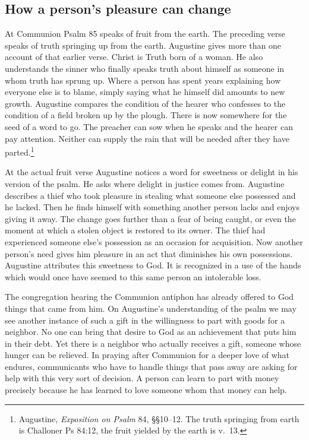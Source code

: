 \subsection{How a person's pleasure can change}

At Communion Psalm 85 speaks of fruit from the earth. The preceding verse speaks of truth springing up from the earth. Augustine gives more than one account of that earlier verse. Christ is Truth born of a woman. He also understands the sinner who finally speaks truth about himself as someone in whom truth has sprung up. Where a person has spent years explaining how everyone else is to blame, simply saying what he himself did amounts to new growth. Augustine compares the condition of the hearer who confesses to the condition of a field broken up by the plough. There is now somewhere for the seed of a word to go. The preacher can sow when he speaks and the hearer can pay attention. Neither can supply the rain that will be needed after they have parted.\footnote{Augustine, \textit{Exposition on Psalm} 84, §§10--12. The truth springing from earth is Challoner Ps 84:12, the fruit yielded by the earth is v.~13.}

At the actual fruit verse Augustine notices a word for sweetness or delight in his version of the psalm. He asks where delight in justice comes from. Augustine describes a thief who took pleasure in stealing what someone else possessed and he lacked. Then he finds himself with something another person lacks and enjoys giving it away. The change goes further than a fear of being caught, or even the moment at which a stolen object is restored to its owner. The thief had experienced someone else's possession as an occasion for acquisition. Now another person's need gives him pleasure in an act that diminishes his own possessions. Augustine attributes this sweetness to God. It is recognized in a use of the hands which would once have seemed to this same person an intolerable loss.

The congregation hearing the Communion antiphon has already offered to God things that came from him. On Augustine's understanding of the psalm we may see another instance of such a gift in the willingness to part with goods for a neighbor. No one can bring that desire to God as an achievement that puts him in their debt. Yet there is a neighbor who actually receives a gift, someone whose hunger can be relieved. In praying after Communion for a deeper love of what endures, communicants who have to handle things that pass away are asking for help with this very sort of decision. A person can learn to part with money precisely because he has learned to love someone whom that money can help.

